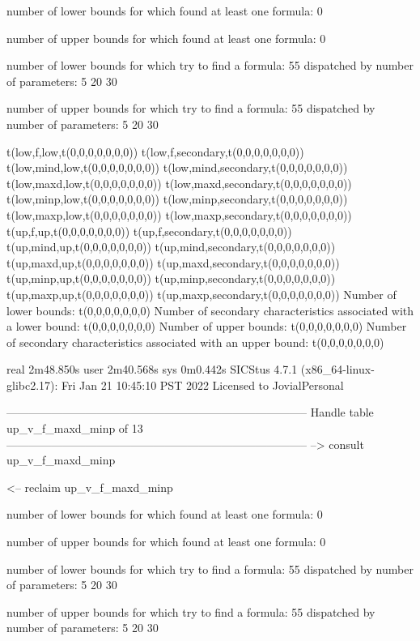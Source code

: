 number of lower bounds for which found at least one formula: 0

number of upper bounds for which found at least one formula: 0

number of lower bounds for which try to find a formula: 55
dispatched by number of parameters: 5  20  30

number of upper bounds for which try to find a formula: 55
dispatched by number of parameters: 5  20  30

t(low,f,low,t(0,0,0,0,0,0,0))
t(low,f,secondary,t(0,0,0,0,0,0,0))
t(low,mind,low,t(0,0,0,0,0,0,0))
t(low,mind,secondary,t(0,0,0,0,0,0,0))
t(low,maxd,low,t(0,0,0,0,0,0,0))
t(low,maxd,secondary,t(0,0,0,0,0,0,0))
t(low,minp,low,t(0,0,0,0,0,0,0))
t(low,minp,secondary,t(0,0,0,0,0,0,0))
t(low,maxp,low,t(0,0,0,0,0,0,0))
t(low,maxp,secondary,t(0,0,0,0,0,0,0))
t(up,f,up,t(0,0,0,0,0,0,0))
t(up,f,secondary,t(0,0,0,0,0,0,0))
t(up,mind,up,t(0,0,0,0,0,0,0))
t(up,mind,secondary,t(0,0,0,0,0,0,0))
t(up,maxd,up,t(0,0,0,0,0,0,0))
t(up,maxd,secondary,t(0,0,0,0,0,0,0))
t(up,minp,up,t(0,0,0,0,0,0,0))
t(up,minp,secondary,t(0,0,0,0,0,0,0))
t(up,maxp,up,t(0,0,0,0,0,0,0))
t(up,maxp,secondary,t(0,0,0,0,0,0,0))
Number of lower bounds:                                             t(0,0,0,0,0,0,0)
Number of secondary characteristics associated with a lower bound:  t(0,0,0,0,0,0,0)
Number of upper bounds:                                             t(0,0,0,0,0,0,0)
Number of secondary characteristics associated with an upper bound: t(0,0,0,0,0,0,0)

real	2m48.850s
user	2m40.568s
sys	0m0.442s
SICStus 4.7.1 (x86_64-linux-glibc2.17): Fri Jan 21 10:45:10 PST 2022
Licensed to JovialPersonal


--------------------------------------------------------------------------------
Handle table up_v_f_maxd_minp of 13
--------------------------------------------------------------------------------
--> consult up_v_f_maxd_minp

<-- reclaim up_v_f_maxd_minp

number of lower bounds for which found at least one formula: 0

number of upper bounds for which found at least one formula: 0

number of lower bounds for which try to find a formula: 55
dispatched by number of parameters: 5  20  30

number of upper bounds for which try to find a formula: 55
dispatched by number of parameters: 5  20  30

